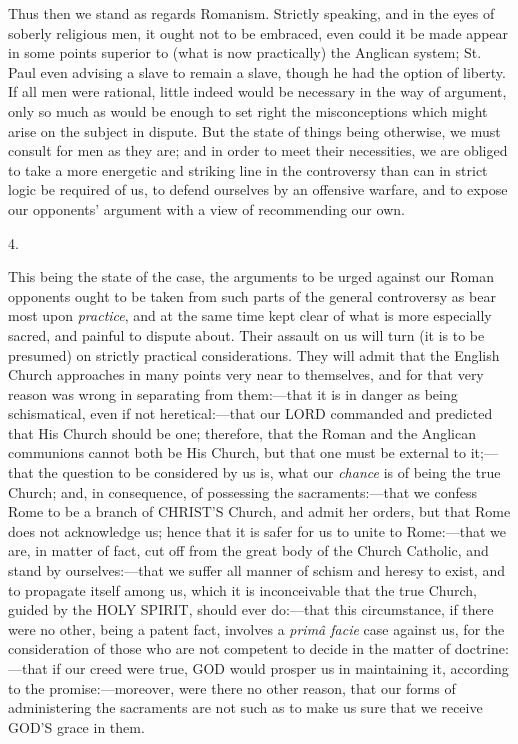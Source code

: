 Thus then we stand as regards Romanism. Strictly
speaking, and in the eyes of soberly religious men, it ought not
to be embraced, even could it be made appear in some points superior
to (what is now practically) the Anglican system; St. Paul even
advising a slave to remain a slave, though he had the option of
liberty. If all men were rational, little indeed would be necessary in
the way of argument, only so much as would be enough to set right the
misconceptions which might arise on the subject in dispute. But the
state of things being otherwise, we must consult for men as they are;
and in order to meet their necessities, we are obliged to take a more
energetic and striking line in the controversy than can in strict
logic be required of us, to defend ourselves by an offensive warfare,
and to expose our opponents' argument with a view of recommending our
own.

4.

This being the state of the case, the arguments
to be urged against our Roman opponents ought to be taken from such
parts of the general controversy as bear most upon \emph{practice},
and at the same time kept clear of what is more especially sacred, and
painful to dispute about. Their assault on us will turn (it is to be
presumed) on strictly practical considerations. They will admit that
the English Church approaches in many points very near to themselves,
and for that very reason was wrong in separating from them:—that it
is in danger as being schismatical, even if not heretical:—that our
LORD commanded and
predicted that His Church should be one; therefore, that the Roman and
the Anglican communions cannot both be His Church, but that one must
be external to it;—that the question to be considered by us is, what
our \emph{chance} is of being the true Church; and, in consequence, of
possessing the sacraments:—that we confess Rome to be a branch of CHRIST'S
Church, and admit her orders, but that Rome does not acknowledge us;
hence that it is safer for us to unite to Rome:—that we are,
in matter of fact, cut off from the great body of the Church Catholic,
and stand by ourselves:—that we suffer all manner of schism and
heresy to exist, and to propagate itself among us, which it is
inconceivable that the true Church, guided by the HOLY
SPIRIT, should ever
do:—that this circumstance, if there were no other, being a patent
fact, involves a \emph{primâ facie} case against us, for the
consideration of those who are not competent to decide in the matter
of doctrine:—that if our creed were true, GOD
would prosper us in maintaining it, according to the
promise:—moreover, were there no other reason, that our forms of
administering the sacraments are not such as to make us sure that we
receive GOD'S grace in
them.

